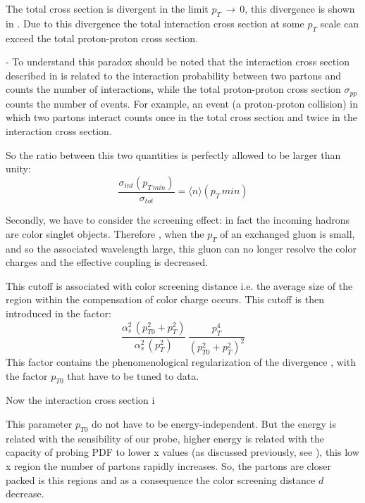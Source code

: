 The total cross section is divergent in the limit $p_T\,\rightarrow\,0$, this divergence is shown in . Due to this divergence the total interaction cross section at some $p_{T}$ scale can exceed the total proton-proton cross section.

\bigskip
-
To understand this paradox should be noted that the interaction cross section described in  is related to the interaction probability between two partons and counts the number of interactions, while the total proton-proton cross section $\sigma_{pp}$ counts the number of events. For example, an event (a proton-proton collision) in which two partons interact counts once in the total cross section and twice in the interaction cross section.

So the ratio between this two quantities is perfectly allowed to be larger than unity:
\begin{equation}
	\frac{\sigma_{int}(p_{T\,min})}{\sigma_{tot}}=\langle n \rangle (p_T\,min)
\end{equation}
 
Secondly, we have to consider the screening effect: in fact the incoming hadrons are color singlet objects. Therefore , when the $p_T$ of an exchanged gluon is small, and so the associated wavelength large, this gluon can no longer resolve the color charges and the effective coupling is decreased.

This cutoff is associated with color screening distance i.e. the average size of the region within the  compensation of color charge occurs.
This cutoff is then introduced in the factor:
\begin{equation}
	\frac{\alpha_s^2\,(p_{T0}^2+p_{T}^2)}{\alpha_s^2\,(p_T^2)}\,\frac{p_T^4}{(p_{T0}^2+p_T^2)^2}
\end{equation}
This factor contains the phenomenological regularization of the divergence , with the factor $p_{T0}$ that have to be tuned to data. 

Now the interaction cross section i

This parameter $p_{T0}$ do not have to be energy-independent. But the energy is related with the sensibility of our probe, higher energy is related with the capacity of probing PDF to lower x values (as discussed previously, see ), this low x region the number of partons rapidly increases. So, the partons are closer packed is this regions and as a consequence the color screening distance $d$ decrease.

